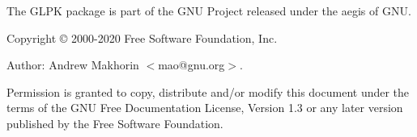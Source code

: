 \documentclass[11pt]{report}
\begin{document}
\thispagestyle{empty}


\newpage

\vspace*{1in}

\vfill

\noindent
The GLPK package is part of the GNU Project released under the aegis of
GNU.

\noindent
Copyright \copyright{} 2000-2020 Free Software Foundation, Inc.

\noindent
Author: Andrew Makhorin $<$mao@gnu.org$>$.

\noindent
Permission is granted to copy, distribute and/or modify this document
under the terms of the GNU Free Documentation License, Version 1.3 or
any later version published by the Free Software Foundation.


\newpage

{\setlength{\parskip}{0pt}\tableofcontents}














\appendix












\end{document}
